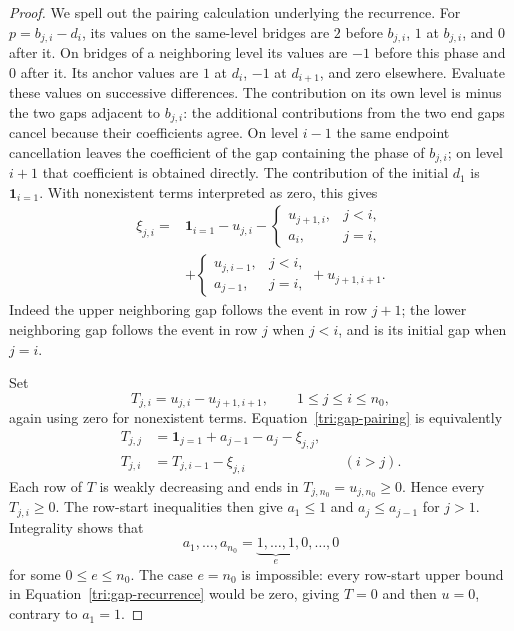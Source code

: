 \begin{proof}
We spell out the pairing calculation underlying the recurrence.
For $p=b_{j,i}-d_i$, its values on the same-level bridges are $2$
before $b_{j,i}$, $1$ at $b_{j,i}$, and $0$ after it.  On bridges
of a neighboring level its values are $-1$ before this phase and
$0$ after it.  Its anchor values are $1$ at $d_i$, $-1$ at
$d_{i+1}$, and zero elsewhere.
Evaluate these values on successive differences.
The contribution on its own level is minus the two gaps adjacent to
$b_{j,i}$: the additional contributions from the two end gaps cancel
because their coefficients agree.  On level $i-1$ the same endpoint
cancellation leaves the coefficient of the gap containing the phase
of $b_{j,i}$; on level $i+1$ that coefficient is obtained directly.
The contribution of the initial $d_1$ is $\boldsymbol1_{i=1}$.
With nonexistent terms interpreted as zero, this gives
\begin{equation}\label{tri:gap-pairing}
\begin{split}
 \xi_{j,i}={}&\boldsymbol1_{i=1}-u_{j,i}
 -\begin{cases}u_{j+1,i},&j<i,\\a_i,&j=i,\end{cases}\\
 &+\begin{cases}u_{j,i-1},&j<i,\\a_{j-1},&j=i,\end{cases}
 +u_{j+1,i+1}.
\end{split}
\end{equation}
Indeed the upper neighboring gap follows the event in row $j+1$;
the lower neighboring gap follows the event in row $j$ when $j<i$,
and is its initial gap when $j=i$.

Set
\[
 T_{j,i}=u_{j,i}-u_{j+1,i+1},\qquad 1\leq j\leq i\leq n_0,
\]
again using zero for nonexistent terms.  Equation~\eqref{tri:gap-pairing}
is equivalently
\begin{equation}\label{tri:gap-recurrence}
 \begin{aligned}
 T_{j,j}&=\boldsymbol1_{j=1}+a_{j-1}-a_j-\xi_{j,j},\\
 T_{j,i}&=T_{j,i-1}-\xi_{j,i} &&(i>j).
 \end{aligned}
\end{equation}
Each row of $T$ is weakly decreasing and ends in
$T_{j,n_0}=u_{j,n_0}\geq0$.  Hence every $T_{j,i}\geq0$.
The row-start inequalities then give $a_1\leq1$ and
$a_j\leq a_{j-1}$ for $j>1$.  Integrality shows that
\[
 a_1,\ldots,a_{n_0}=\underbrace{1,\ldots,1}_{e},0,\ldots,0
\]
for some $0\leq e\leq n_0$.
The case $e=n_0$ is impossible: every row-start upper bound in
Equation~\eqref{tri:gap-recurrence} would be zero, giving $T=0$
and then $u=0$, contrary to $a_1=1$.


\end{proof}
